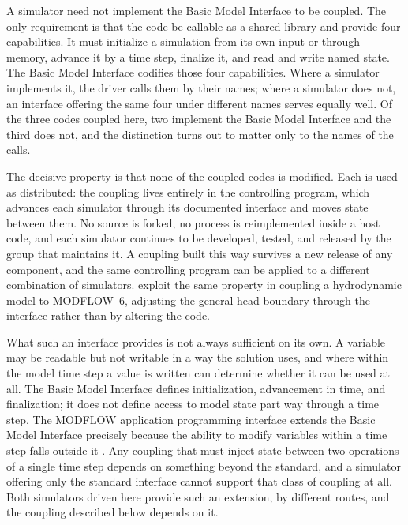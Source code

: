 \documentclass[preprint,authoryear,11pt]{elsarticle}
\begin{document}
A simulator need not implement the Basic Model Interface to be coupled. The only requirement is that the code be callable as a shared library and provide four capabilities. It must initialize a simulation from its own input or through memory, advance it by a time step, finalize it, and read and write named state. The Basic Model Interface codifies those four capabilities. Where a simulator implements it, the driver calls them by their names; where a simulator does not, an interface offering the same four under different names serves equally well. Of the three codes coupled here, two implement the Basic Model Interface and the third does not, and the distinction turns out to matter only to the names of the calls.

The decisive property is that none of the coupled codes is modified. Each is used as distributed: the coupling lives entirely in the controlling program, which advances each simulator through its documented interface and moves state between them. No source is forked, no process is reimplemented inside a host code, and each simulator continues to be developed, tested, and released by the group that maintains it. A coupling built this way survives a new release of any component, and the same controlling program can be applied to a different combination of simulators. \cite{jin2025gwocean} exploit the same property in coupling a hydrodynamic model to MODFLOW~6, adjusting the general-head boundary through the interface rather than by altering the code.

What such an interface provides is not always sufficient on its own. A variable may be readable but not writable in a way the solution uses, and where within the model time step a value is written can determine whether it can be used at all. The Basic Model Interface defines initialization, advancement in time, and finalization; it does not define access to model state part way through a time step. The MODFLOW application programming interface extends the Basic Model Interface precisely because the ability to modify variables within a time step falls outside it \citep{hughes2022modflowapi}. Any coupling that must inject state between two operations of a single time step depends on something beyond the standard, and a simulator offering only the standard interface cannot support that class of coupling at all. Both simulators driven here provide such an extension, by different routes, and the coupling described below depends on it.
\end{document}
